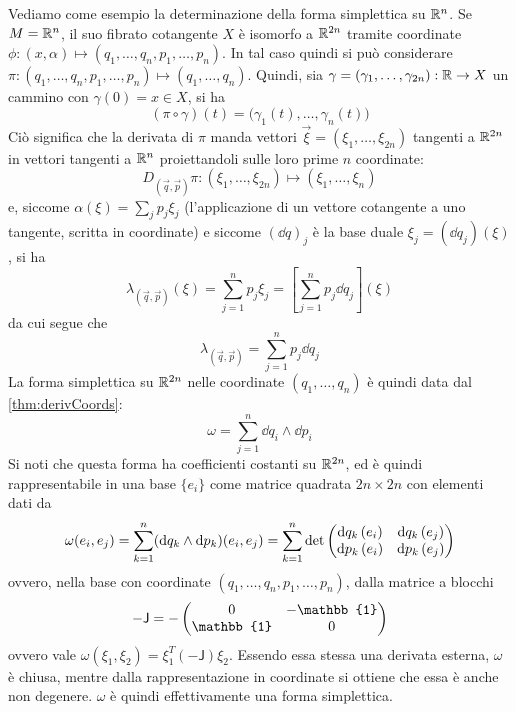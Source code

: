 Vediamo come esempio la determinazione della forma simplettica su $\mathbb{R}^{n}$. Se $M = \mathbb{R}^{n}$, il suo fibrato cotangente $X$ è isomorfo a $\mathbb{R}^{2n}$ tramite coordinate $\phi: (x, \alpha) \mapsto (q_1, \ldots, q_n, p_1, \ldots, p_n)$. In tal caso quindi si può considerare $\pi: (q_1, \ldots, q_n, p_1, \ldots, p_n) \mapsto  (q_1, \ldots, q_n)$. Quindi, sia $\gamma = (\gamma_1, \ldots, \gamma_{2n}):\mathbb{R} \to X$ un cammino con $\gamma(0) = x \in X$, si ha \begin{equation*}
(\pi \circ {\gamma}) (t) = \big({\gamma}_1(t), \ldots, {\gamma}_n (t)\big)
\end{equation*} 
Ciò significa che la derivata di $\pi$ manda vettori $\vec{\xi} = (\xi_1, \ldots, \xi_{2n})$ tangenti a $\mathbb{R}^{2n}$ in vettori tangenti a $\mathbb{R}^{n}$ proiettandoli sulle loro prime $n$ coordinate:
\begin{equation*}
  D_{(\vec{q},\vec{p})}\pi: (\xi_1, \ldots, \xi_{2n}) \mapsto  (\xi_1, \ldots, \xi_n)
\end{equation*}
e, siccome $\alpha(\xi) = \sum_j p_j \xi_j$ (l'applicazione di un vettore cotangente a uno tangente, scritta in coordinate) e siccome $(\dd{q})_j$ è la base duale $\xi_j = (\dd{q}_j)(\xi)$, si ha \begin{equation*}
\lambda_{(\vec{q},\vec{p})} (\xi) = \sum_{j=1}^n p_j \xi_j = \left[\sum_{j=1}^n p_j \dd{q_j}\right] (\xi)
\end{equation*} 
da cui segue che \begin{equation}
  \lambda_{(\vec{q},\vec{p})} = \sum_{j=1}^n p_j \dd{q_j}
\end{equation} 
La forma simplettica su $\mathbb{R}^{2n}$ nelle coordinate $(q_1, \ldots, q_n)$ è quindi data dal \autoref{thm:derivCoords}: 
\begin{equation} \label{eq:R2nSympForm}
\omega = \sum_{j=1}^n \dd{q_i} \wedge \dd{p_i}
\end{equation} 
Si noti che questa forma ha coefficienti costanti su $\mathbb{R}^{2n}$, ed è quindi rappresentabile in una base $\{e_i\}$ come matrice quadrata $2n \times 2n$ con elementi dati da 
\begin{equation*}
\omega(e_i, e_j) = \sum_{k=1}^{n} (\dd{q_k} \wedge \dd{p_k})(e_i, e_j) = \sum_{k=1}^{n} \det\pmqty{\dd{q_k}(e_i) & \dd{q_k}(e_j) \\\dd{p_k}(e_i) & \dd{p_k}(e_j)}
\end{equation*}
ovvero, nella base con coordinate $(q_1, \ldots, q_n, p_1, \ldots, p_n)$, dalla matrice a blocchi
\begin{equation*}
- \mathsf{J} = - \pmqty{0 & -\mathbb{1} \\ \mathbb{1} & 0}
\end{equation*} 
ovvero vale $\omega(\xi_1, \xi_2) = \xi_1^T (-\mathsf{J}) \xi_2$. Essendo essa stessa una derivata esterna, $\omega$ è chiusa, mentre dalla rappresentazione in coordinate si ottiene che essa è anche non degenere. $\omega$ è quindi effettivamente una forma simplettica.

